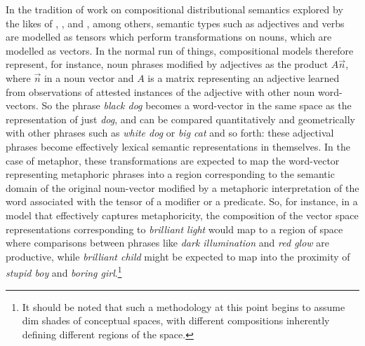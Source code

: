 In the tradition of work on compositional distributional semantics explored by the likes of \cite{MitchellEA2010}, \cite{BaroniEA2010}, and \cite{CoeckeEA2011}, among others, semantic types such as adjectives and verbs are modelled as tensors which perform transformations on nouns, which are modelled as vectors.  In the normal run of things, compositional models therefore represent, for instance, noun phrases modified by adjectives as the product $A\overrightarrow{n}$, where $\overrightarrow{n}$ in a noun vector and $A$ is a matrix representing an adjective learned from observations of attested instances of the adjective with other noun word-vectors.  So the phrase \emph{black dog} becomes a word-vector in the same space as the representation of just \emph{dog}, and can be compared quantitatively and geometrically with other phrases such as \emph{white dog} or \emph{big cat} and so forth: these adjectival phrases become effectively lexical semantic representations in themselves.  In the case of metaphor, these transformations are expected to map the word-vector representing metaphoric phrases into a region corresponding to the semantic domain of the original noun-vector modified by a metaphoric interpretation of the word associated with the tensor of a modifier or a predicate.  So, for instance, in a model that effectively captures metaphoricity, the composition of the vector space representations corresponding to \emph{brilliant light} would map to a region of space where comparisons between phrases like \emph{dark illumination} and \emph{red glow} are productive, while \emph{brilliant child} might be expected to map into the proximity of \emph{stupid boy} and \emph{boring girl}.\footnote{It should be noted that such a methodology at this point begins to assume dim shades of  conceptual spaces, with different compositions inherently defining different regions of the space.}

